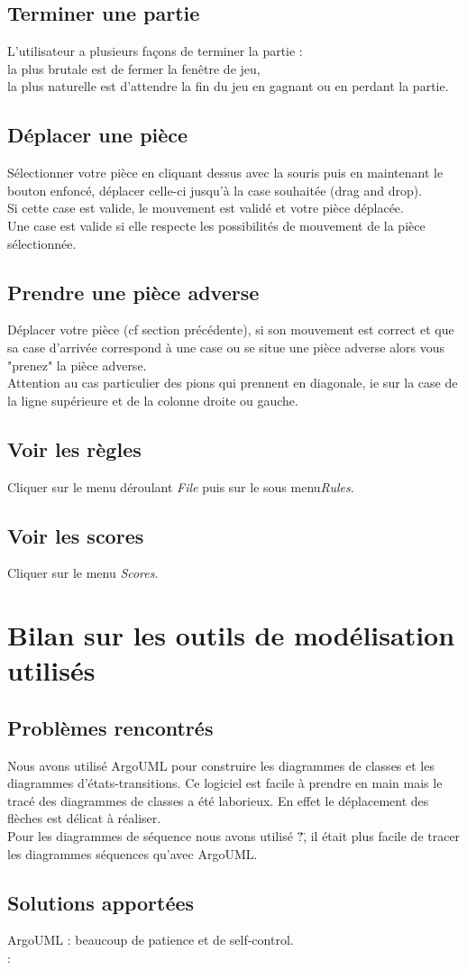 \documentclass[12pt,a4paper]{report}
\begin{document}
\section*{Terminer une partie}
L'utilisateur a plusieurs façons de terminer la partie :
\\la plus brutale est de fermer la fenêtre de jeu, 
\\ la plus naturelle est d'attendre la fin du jeu en gagnant ou en perdant la partie. 
\section*{Déplacer une pièce}
Sélectionner votre pièce en cliquant dessus avec la souris puis en maintenant le bouton enfoncé, déplacer celle-ci jusqu'à la case souhaitée (drag and drop).
\\Si cette case est valide, le mouvement est validé et votre pièce déplacée.
\\Une case est valide si elle respecte les possibilités de mouvement de la pièce sélectionnée.
\section*{Prendre une pièce adverse}
Déplacer votre pièce (cf section précédente), si son mouvement est correct et que sa case d'arrivée correspond à une case ou se situe une pièce adverse alors vous "prenez" la pièce adverse.
\\ Attention au cas particulier des pions qui prennent en diagonale, ie sur la case de la ligne supérieure et de la colonne droite ou gauche.
\section*{Voir les règles}
Cliquer sur le menu déroulant {\it File} puis sur le sous menu{\it Rules}.
\section*{Voir les scores}
Cliquer sur le menu {\it Scores}.

\maketitle
\chapter*{Bilan sur les outils de modélisation utilisés}

\section*{Problèmes rencontrés}
Nous avons utilisé ArgoUML pour construire les diagrammes de classes et les diagrammes d'états-transitions. Ce logiciel est facile à prendre en main mais le tracé des diagrammes de classes a été laborieux. En effet le déplacement des flèches est délicat à réaliser.
\\Pour les diagrammes de séquence nous avons utilisé \"?\", il était plus facile de tracer les diagrammes séquences qu'avec ArgoUML.


\section*{Solutions apportées}
ArgoUML : beaucoup de patience et de self-control.
\\:
\end{document}
